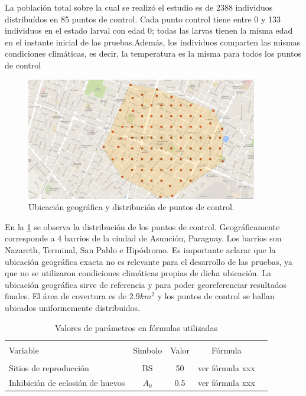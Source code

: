 
La población total sobre la cual se realizó el estudio es de 2388 individuos
distribuídos en 85 puntos de control. Cada punto control tiene entre 0 y 133
individuos en el estado larval con edad 0; todas las larvas tienen la misma edad
en el instante inicial de las pruebas.Además, los individuos comparten 
las mismas condiciones climáticas, es decir, la temperatura es la misma
para todos los puntos de control \\

\begin{figure}
\centering
\includegraphics[width=0.9\textwidth]{./capitulo-6/graphics/puntoscontroldistribuido.png}
\caption{\label{fig:distribucion-puntos}Ubicación geográfica y distribución de puntos de control.}
\end{figure}


En la \ref{fig:distribucion-puntos} se observa la distribución de los puntos de control. Geográficamente
corresponde a 4 barrios de la ciudad de Asunción, Paraguay. Los barrios son Nazareth, 
Terminal, San Pablo e Hipódromo. Es importante aclarar que la ubicación geográfica
exacta no es relevante para el desarrollo de las pruebas, ya que no se utilizaron
condiciones climáticas propias de dicha ubicación. La ubicación geográfica sirve 
de referencia y para poder georeferenciar resultados finales. El área de covertura 
es de 2.9$km^2$ y los puntos de control se hallan ubicados uniformemente distribuidos.\\


\begin{table}
    \begin{center}
        \caption{ \label{tab:valores-formulas} Valores de parámetros en fórmulas utilizadas}
        \begin{tabular}{p{3cm} c c c c}
            \hline \\
            Variable & Simbolo & Valor & Fórmula \\
            \hline
            \hline \\
            Sitios de reproducción &  BS & 50 & ver fórmula xxx\\
            Inhibición de eclosión de huevos & $A_{0}$ & 0.5 & ver fórmula xxx\\
        \end{tabular}
    \end{center}
\end{table}
					  
